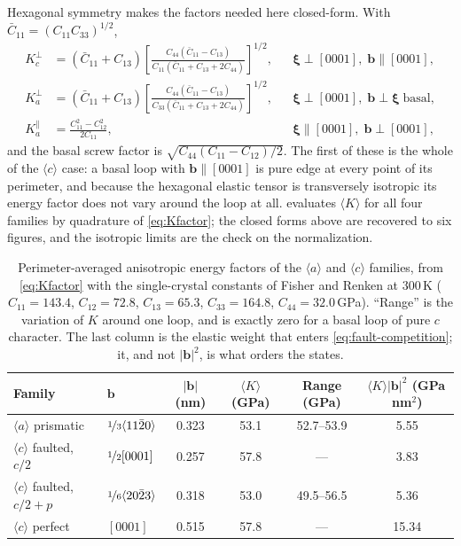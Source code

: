 \documentclass{article}
\newcommand{\aloop}{\ensuremath{\langle a\rangle}}
\newcommand{\cloop}{\ensuremath{\langle c\rangle}}
\newcommand{\bvec}{\bm b}
\begin{document}
Hexagonal symmetry makes the factors needed here closed-form. With
$\bar C_{11}=(C_{11}C_{33})^{1/2}$,
\begin{align}
  K^{\perp}_{c}&=(\bar C_{11}+C_{13})
     \left[\frac{C_{44}(\bar C_{11}-C_{13})}
                {C_{11}(\bar C_{11}+C_{13}+2C_{44})}\right]^{1/2},
   & &\bm\xi\perp[0001],\;\bvec\parallel[0001],
   \label{eq:Kperp-c}\\
  K^{\perp}_{a}&=(\bar C_{11}+C_{13})
     \left[\frac{C_{44}(\bar C_{11}-C_{13})}
                {C_{33}(\bar C_{11}+C_{13}+2C_{44})}\right]^{1/2},
   & &\bm\xi\perp[0001],\;\bvec\perp\bm\xi\;\text{basal},
   \label{eq:Kperp-a}\\
  K^{\parallel}_{a}&=\frac{C_{11}^{2}-C_{12}^{2}}{2C_{11}},
   & &\bm\xi\parallel[0001],\;\bvec\perp[0001],
   \label{eq:Kpar-a}
\end{align}
and the basal screw factor is $\sqrt{C_{44}(C_{11}-C_{12})/2}$. The first of
these is the whole of the \cloop{} case: a basal loop with $\bvec\parallel[0001]$
is pure edge at every point of its perimeter, and because the hexagonal elastic
tensor is transversely isotropic its energy factor does not vary around the loop
at all.  evaluates $\langle K\rangle$ for all four families by
quadrature of \cref{eq:Kfactor}; the closed forms above are recovered to six
figures, and the isotropic limits are the check on the normalization.

\begin{table}[htbp]
\centering
\caption{Perimeter-averaged anisotropic energy factors of the \aloop{} and
\cloop{} families, from \cref{eq:Kfactor} with the single-crystal constants of
Fisher and Renken \citep{fisher1964single} at $300\,$K ($C_{11}=143.4$, $C_{12}=72.8$,
$C_{13}=65.3$, $C_{33}=164.8$, $C_{44}=32.0\,$GPa). ``Range'' is the variation of
$K$ around one loop, and is exactly zero for a basal loop of pure $c$ character.
The last column is the elastic weight that enters \cref{eq:fault-competition};
it, and not $|\bvec|^{2}$, is what orders the states.}
\label{tab:Kfactors}
\setlength{\extrarowheight}{3pt}
\begin{tabular}{@{}l l c c c c@{}}
\toprule
Family & $\bvec$ & $|\bvec|$ (nm) & $\langle K\rangle$ (GPa)
  & Range (GPa) & $\langle K\rangle|\bvec|^{2}$ (GPa\,nm$^{2}$)\\
\midrule
\aloop{} prismatic & $\nicefrac{1}{3}\langle11\bar20\rangle$ & 0.323 & 53.1
  & 52.7--53.9 & 5.55\\
\cloop{} faulted, $c/2$ & $\nicefrac{1}{2}[0001]$ & 0.257 & 57.8
  & --- & 3.83\\
\cloop{} faulted, $c/2{+}p$ & $\nicefrac{1}{6}\langle20\bar23\rangle$ & 0.318 & 53.0
  & 49.5--56.5 & 5.36\\
\cloop{} perfect & $[0001]$ & 0.515 & 57.8
  & --- & 15.34\\
\bottomrule
\end{tabular}
\end{table}
\end{document}
